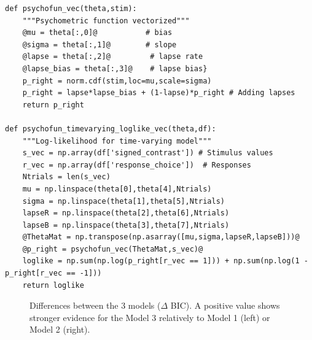 \begin{lstlisting}[style=base]
def psychofun_vec(theta,stim):
    """Psychometric function vectorized"""
    @mu = theta[:,0]@           # bias
    @sigma = theta[:,1]@        # slope
    @lapse = theta[:,2]@         # lapse rate
    @lapse_bias = theta[:,3]@    # lapse bias}
    p_right = norm.cdf(stim,loc=mu,scale=sigma)    
    p_right = lapse*lapse_bias + (1-lapse)*p_right # Adding lapses
    return p_right

def psychofun_timevarying_loglike_vec(theta,df):
    """Log-likelihood for time-varying model"""
    s_vec = np.array(df['signed_contrast']) # Stimulus values
    r_vec = np.array(df['response_choice'])  # Responses
    Ntrials = len(s_vec)
    mu = np.linspace(theta[0],theta[4],Ntrials)
    sigma = np.linspace(theta[1],theta[5],Ntrials)
    lapseR = np.linspace(theta[2],theta[6],Ntrials)
    lapseB = np.linspace(theta[3],theta[7],Ntrials)
    @ThetaMat = np.transpose(np.asarray([mu,sigma,lapseR,lapseB]))@ 
    @p_right = psychofun_vec(ThetaMat,s_vec)@
    loglike = np.sum(np.log(p_right[r_vec == 1])) + np.sum(np.log(1 - p_right[r_vec == -1]))
    return loglike
\end{lstlisting}

\begin{figure}[!hbt]
\begin{center}
\end{center}
\caption{Differences between the 3 models ($\Delta$ BIC). A positive value shows stronger evidence for the Model 3 relatively to Model 1 (left) or Model 2 (right).}
\label{fig:time}
\end{figure}